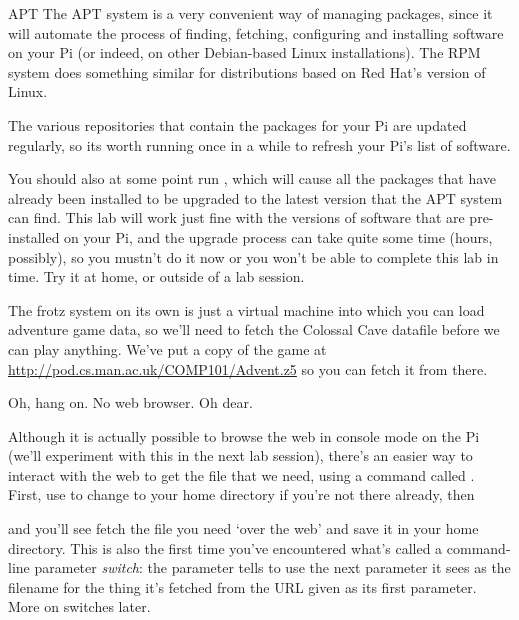 \begin{rpi}{APT}
The APT system is a very convenient way of managing packages, since it will automate the process of finding, fetching, configuring and installing software on your Pi (or indeed, on other Debian-based Linux installations). The RPM system does something similar for distributions based on Red Hat's version of Linux.

The various repositories that contain the packages for your Pi are updated regularly, so its worth running  once in a while to refresh your Pi's list of software. 

You should also at some point run , which will cause all the packages that have already been installed to be upgraded to the latest version that the APT system can find. This lab will work just fine with the versions of software that are pre-installed on your Pi, and the upgrade process can take quite some time (hours, possibly), so you mustn't do it now or you won't be able to complete this lab in time. Try it at home, or outside of a lab session. 
\end{rpi}

The frotz system on its own is just a virtual machine into which you can load adventure game data, so we'll need to fetch the Colossal Cave datafile before we can play anything. We've put a copy of the game at \url{http://pod.cs.man.ac.uk/COMP101/Advent.z5} so you can fetch it from there.

Oh, hang on. No web browser. Oh dear.

Although it is actually possible to browse the web in console mode on the Pi (we'll experiment with this in the next lab session), there's an easier way to interact with the web to get the file that we need, using a command called . First, use  to change to your home directory if you're not there already, then


\noindent and you'll see  fetch the file you need `over the web' and save it in your home directory. This is also the first time you've encountered what's called a command-line parameter \textit{switch}: the  parameter tells  to use the next parameter it sees as the filename for the thing it's fetched from the URL given as its first parameter. More on switches later. 


